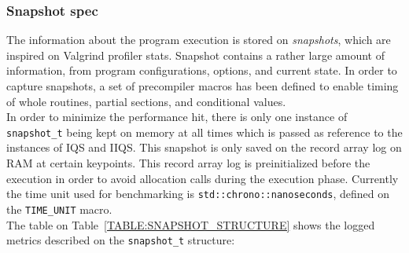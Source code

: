 \subsubsection{Snapshot spec}
The information about the program execution is stored on \textit{snapshots}, which are inspired on Valgrind profiler stats. Snapshot contains a rather large amount of information, from program configurations, options, and current state. In order to capture snapshots, a set of precompiler macros has been defined to enable timing of whole routines, partial sections, and conditional values. \\

In order to minimize the performance hit, there is only one instance of \texttt{snapshot\_t} being kept on memory at all times which is passed as reference to the instances of IQS and IIQS. This snapshot is only saved on the record array log on RAM at certain keypoints. This record array log is preinitialized before the execution in order to avoid allocation calls during the execution phase. Currently the time unit used for benchmarking is \texttt{std::chrono::nanoseconds}, defined on the \texttt{TIME\_UNIT} macro.\\

The table on Table~\ref{TABLE:SNAPSHOT_STRUCTURE} shows the logged metrics described on the \texttt{snapshot\_t} structure:\\

